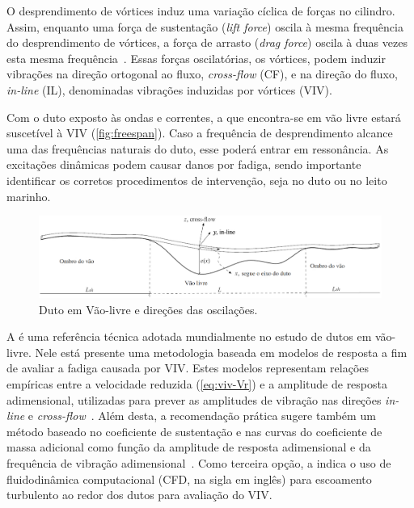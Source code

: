 O desprendimento de vórtices induz uma variação cíclica de forças no cilindro.
Assim, enquanto uma força de sustentação (\textit{lift force}) oscila à mesma frequência do desprendimento de vórtices, a força de arrasto (\textit{drag force}) oscila à duas vezes esta mesma frequência~\cite{Sumer1995}.
Essas forças oscilatórias, os vórtices, podem induzir vibrações na direção ortogonal ao fluxo, \textit{cross-flow} (CF), e na direção do fluxo, \textit{in-line} (IL), denominadas vibrações induzidas por vórtices (VIV).

Com o duto exposto às ondas e correntes, a que encontra-se em vão livre estará suscetível à VIV (\autoref{fig:freespan}).\@
Caso a frequência de desprendimento alcance uma das frequências naturais do duto, esse poderá entrar em ressonância.
As excitações dinâmicas podem causar danos por fadiga, sendo importante identificar os corretos procedimentos de intervenção, seja no duto ou no leito marinho.

\begin{figure}[!ht]
	\centering
    \caption{Duto em Vão-livre e direções das oscilações.}\label{fig:freespan}
	\includegraphics[width=1\textwidth]{imagens/freespan}
\end{figure}

A  é uma referência técnica adotada mundialmente no estudo de dutos em vão-livre.
Nele está presente uma metodologia baseada em modelos de resposta a fim de avaliar a fadiga causada por VIV\@.
Estes modelos representam relações empíricas entre a velocidade reduzida (\autoref{eq:viv-Vr}) e a amplitude de resposta adimensional, utilizadas para prever as amplitudes de vibração nas direções \textit{in-line} e \textit{cross-flow}~\cite{Mork2003,DNV2017}.
Além desta, a recomendação prática sugere também um método baseado no coeficiente de sustentação e nas curvas do coeficiente de massa adicional como função da amplitude de resposta adimensional e da frequência de vibração adimensional~\cite{DNV2017}.
Como terceira opção, a  indica o uso de fluidodinâmica computacional (CFD, na sigla em inglês) para escoamento turbulento ao redor dos dutos para avaliação do VIV\@.

